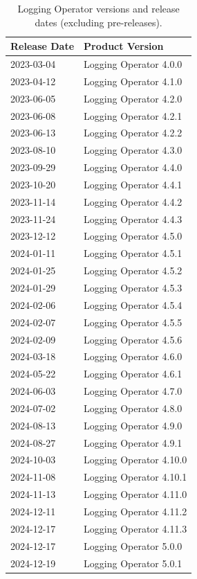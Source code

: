 \documentclass[../main.tex]{subfiles}
\begin{document}
\begin{table}[h]
    \centering
    \begin{tabular}{|l|l|}
        \hline
        \textbf{Release Date} & \textbf{Product Version} \\
        \hline
        2023-03-04 & Logging Operator 4.0.0 \\
        2023-04-12 & Logging Operator 4.1.0 \\
        2023-06-05 & Logging Operator 4.2.0 \\
        2023-06-08 & Logging Operator 4.2.1 \\
        2023-06-13 & Logging Operator 4.2.2 \\
        2023-08-10 & Logging Operator 4.3.0 \\
        2023-09-29 & Logging Operator 4.4.0 \\
        2023-10-20 & Logging Operator 4.4.1 \\
        2023-11-14 & Logging Operator 4.4.2 \\
        2023-11-24 & Logging Operator 4.4.3 \\
        2023-12-12 & Logging Operator 4.5.0 \\
        2024-01-11 & Logging Operator 4.5.1 \\
        2024-01-25 & Logging Operator 4.5.2 \\
        2024-01-29 & Logging Operator 4.5.3 \\
        2024-02-06 & Logging Operator 4.5.4 \\
        2024-02-07 & Logging Operator 4.5.5 \\
        2024-02-09 & Logging Operator 4.5.6 \\
        2024-03-18 & Logging Operator 4.6.0 \\
        2024-05-22 & Logging Operator 4.6.1 \\
        2024-06-03 & Logging Operator 4.7.0 \\
        2024-07-02 & Logging Operator 4.8.0 \\
        2024-08-13 & Logging Operator 4.9.0 \\
        2024-08-27 & Logging Operator 4.9.1 \\
        2024-10-03 & Logging Operator 4.10.0 \\
        2024-11-08 & Logging Operator 4.10.1 \\
        2024-11-13 & Logging Operator 4.11.0 \\
        2024-12-11 & Logging Operator 4.11.2 \\
        2024-12-17 & Logging Operator 4.11.3 \\
        2024-12-17 & Logging Operator 5.0.0 \\
        2024-12-19 & Logging Operator 5.0.1 \\
        \hline
    \end{tabular}
   \caption{Logging Operator versions and release dates (excluding pre-releases). \protect\footnotemark}
    \label{table:logging_operator_filtered_versions}
\end{table}
\end{document}

